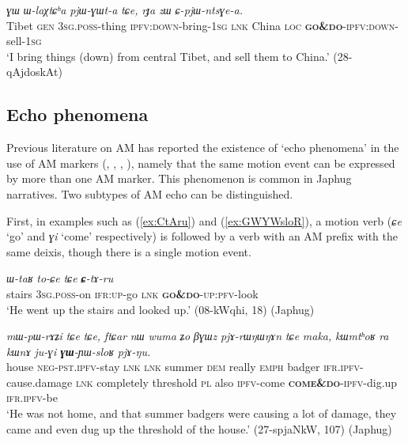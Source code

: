 \documentclass[oneside,a4paper,11pt]{article}
\newcommand{\ipa}[1]{{\phon\textit{#1}}}
\newcommand{\japhug}[2]{\textit{\phon#1} `#2'}
\newcommand{\rouge}[1]{\textbf{#1}}
\begin{document}
\begin{exe}
\ex \label{ex:pjWGWta2}
\gll \ipa{pot} 	\ipa{ɣɯ} 	\ipa{ɯ-laχtɕʰa} 	\ipa{pjɯ-ɣɯt-a} 	\ipa{tɕe,} 	\ipa{rɟa} 	\ipa{zɯ} 	\ipa{ɕ-pjɯ-ntsɣe-a.}  \\
Tibet \textsc{gen} \textsc{3sg}.\textsc{poss}-thing  \textsc{ipfv}:\textsc{down}-bring-\textsc{1sg} \textsc{lnk} China \textsc{loc} \textsc{\rouge{go\&do}}-\textsc{ipfv}:\textsc{down}-sell-\textsc{1sg} \\
\glt `I bring things (down) from central Tibet, and sell them to China.' (28-qAjdoskAt)
\end{exe}


\subsection{Echo phenomena} \label{sec:AM.echo}
Previous literature on AM has reported the existence of `echo phenomena' in the use of AM markers (\citealt[251]{wilkins91associated.motion}, \citealt[681-683]{vuillermet12eseejja}, \citealt[128-130]{rose15am}, \citealt[11]{guillaume16am}), namely that the same motion event can be expressed by more than one AM marker. This phenomenon is common in Japhug narratives. Two subtypes of AM echo can be distinguished.

First, in examples such as (\ref{ex:CtAru}) and (\ref{ex:GWYWsloR}), a motion verb (\japhug{ɕe}{go} and \japhug{ɣi}{come} respectively) is followed by a verb with an AM prefix with the same deixis, though there is a single motion event.

\begin{exe}
\ex \label{ex:CtAru}
\gll \ipa{tɕʰi}	\ipa{ɯ-taʁ}	\ipa{to-ɕe}	\ipa{tɕe}	\ipa{\rouge{ɕ}-tɤ-ru}   \\
stairs \textsc{3sg}.\textsc{poss}-on \textsc{ifr}:\textsc{up}-go \textsc{lnk}  \rouge{\textsc{go\&do}}-\textsc{up}:\textsc{pfv}-look \\
\glt `He went up the stairs and looked up.'  (08-kWqhi, 18) (Japhug)
\end{exe}

\begin{exe}
\ex \label{ex:GWYWsloR}
\gll \ipa{kʰa}	\ipa{mɯ-pɯ-rɤʑi}	\ipa{tɕe}	\ipa{tɕe,}	\ipa{ftɕar}	\ipa{nɯ}	\ipa{wuma}	\ipa{ʑo}	\ipa{βɣɯz}	\ipa{pjɤ-rɯŋɯŋɤn}	\ipa{tɕe}	\ipa{maka,}	\ipa{kɯmtʰoʁ}	\ipa{ra}	\ipa{kɯnɤ}	\ipa{ju-ɣi}	\ipa{\rouge{ɣɯ}-ɲɯ-sloʁ}	\ipa{pjɤ-ŋu.} \\
house \textsc{neg}-\textsc{pst}.\textsc{ipfv}-stay \textsc{lnk} \textsc{lnk} summer \textsc{dem} really \textsc{emph} badger \textsc{ifr}.\textsc{ipfv}-cause.damage \textsc{lnk} completely threshold \textsc{pl} also \textsc{ipfv}-come \rouge{\textsc{come\&do}}-\textsc{ipfv}-dig.up \textsc{ifr}.\textsc{ipfv}-be \\
\glt `He was not home, and that summer badgers were causing a lot of damage, they came and even dug up  the threshold of the house.'  (27-spjaNkW, 107) (Japhug)
\end{exe}
\end{document}
